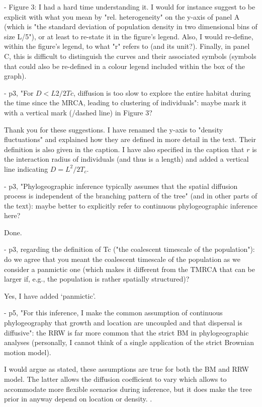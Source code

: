 \documentclass[11pt, oneside]{article}   	%
\newcommand{\response}[1]{{\color{black}{\bf Response:} #1}}
\begin{document}
- Figure 3: I had a hard time understanding it. I would for instance suggest to be explicit with what you mean by "rel. heterogeneity" on the y-axis of panel A (which is "the standard deviation of population density in two dimensional bins of size L/5"), or at least to re-state it in the figure's legend. Also, I would re-define, within the figure's legend, to what "r" refers to (and its unit?). Finally, in panel C, this is difficult to distinguish the curves and their associated symbols (symbols that could also be re-defined in a colour legend included within the box of the graph).

- p3, "For $D < L2/2Tc$, diffusion is too slow to explore the entire habitat during the time since the MRCA, leading to clustering of individuals": maybe mark it with a vertical mark (/dashed line) in Figure 3?

\response{Thank you for these suggestions. I have renamed the y-axis to "density fluctuations" and explained how they are defined in more detail in the text. Their definition is also given in the caption. I have also specified in the caption that $r$ is the interaction radius of individuals (and thus is a length) and added a vertical line indicating $D=L^2/2T_c$.  }


- p3, "Phylogeographic inference typically assumes that the spatial diffusion process is independent of the branching pattern of the tree" (and in other parts of the text): maybe better to explicitly refer to continuous phylogeographic inference here?

\response{Done.}

- p3, regarding the definition of Tc ("the coalescent timescale of the population"): do we agree that you meant the coalescent timescale of the population as we consider a panmictic one (which makes it different from the TMRCA that can be larger if, e.g., the population is rather spatially structured)?

\response{Yes, I have added `panmictic'.}

- p5, "For this inference, I make the common assumption of continuous phylogeography that growth and location are uncoupled and that dispersal is diffusive": the RRW is far more common that the strict BM in phylogeographic analyses (personally, I cannot think of a single application of the strict Brownian motion model).

\response{I would argue as stated, these assumptions are true for both the BM and RRW model. The latter allows the diffusion coefficient to vary which allows to accommodate more flexible scenarios during inference, but it does make the tree prior in anyway depend on location or density. }.
\end{document}
